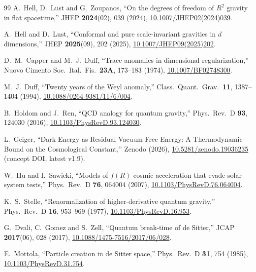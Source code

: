 \documentclass[aps,prd,twocolumn,superscriptaddress,nofootinbib]{revtex4-2}
\begin{document}
\begin{thebibliography}{99}
A.~Hell, D.~Lust and G.~Zoupanos,
``On the degrees of freedom of $R^2$ gravity in flat spacetime,''
JHEP \textbf{2024}(02), 039 (2024),
\href{https://doi.org/10.1007/JHEP02(2024)039}{10.1007/JHEP02(2024)039}.

A.~Hell and D.~Lust,
``Conformal and pure scale-invariant gravities in $d$ dimensions,''
JHEP \textbf{2025}(09), 202 (2025),
\href{https://doi.org/10.1007/JHEP09(2025)202}{10.1007/JHEP09(2025)202}.

D.~M.~Capper and M.~J.~Duff,
``Trace anomalies in dimensional regularization,''
Nuovo Cimento Soc.\ Ital.\ Fis.\ \textbf{23A}, 173--183 (1974),
\href{https://doi.org/10.1007/BF02748300}{10.1007/BF02748300}.

M.~J.~Duff,
``Twenty years of the Weyl anomaly,''
Class.\ Quant.\ Grav.\ \textbf{11}, 1387--1404 (1994),
\href{https://doi.org/10.1088/0264-9381/11/6/004}{10.1088/0264-9381/11/6/004}.

B.~Holdom and J.~Ren,
``QCD analogy for quantum gravity,''
Phys.\ Rev.\ D \textbf{93}, 124030 (2016),
\href{https://doi.org/10.1103/PhysRevD.93.124030}{10.1103/PhysRevD.93.124030}.


L.~Geiger,
``Dark Energy as Residual Vacuum Free Energy: A Thermodynamic Bound on the Cosmological Constant,''
Zenodo (2026), \href{https://doi.org/10.5281/zenodo.19036235}{10.5281/zenodo.19036235} (concept DOI; latest v1.9).

W.~Hu and I.~Sawicki,
``Models of $f(R)$ cosmic acceleration that evade solar-system tests,''
Phys.\ Rev.\ D \textbf{76}, 064004 (2007),
\href{https://doi.org/10.1103/PhysRevD.76.064004}{10.1103/PhysRevD.76.064004}.

K.~S.~Stelle,
``Renormalization of higher-derivative quantum gravity,''
Phys.\ Rev.\ D \textbf{16}, 953--969 (1977),
\href{https://doi.org/10.1103/PhysRevD.16.953}{10.1103/PhysRevD.16.953}.

G.~Dvali, C.~Gomez and S.~Zell,
``Quantum break-time of de Sitter,''
JCAP \textbf{2017}(06), 028 (2017),
\href{https://doi.org/10.1088/1475-7516/2017/06/028}{10.1088/1475-7516/2017/06/028}.

E.~Mottola,
``Particle creation in de Sitter space,''
Phys.\ Rev.\ D \textbf{31}, 754 (1985),
\href{https://doi.org/10.1103/PhysRevD.31.754}{10.1103/PhysRevD.31.754}.


\end{thebibliography}
\end{document}
